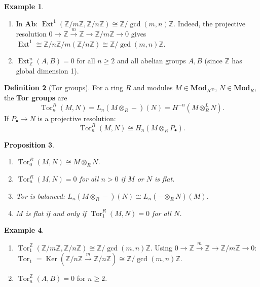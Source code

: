 \documentclass[a4paper,12pt]{book}
\DeclareMathOperator{\Ker}{Ker}
\newcommand{\Ab}{\mathbf{Ab}}
\newcommand{\Mod}{\mathbf{Mod}}
\newcommand{\op}{\mathrm{op}}
\theoremstyle{definition}
\newtheorem{definition}{Definition}[section]
\newtheorem{example}[definition]{Example}
\theoremstyle{plain}
\newtheorem{proposition}[definition]{Proposition}
\theoremstyle{remark}
\begin{document}
\begin{example}\label{ex:ext-computations}
\begin{enumerate}
    \item{}
    In $\Ab$: $\operatorname{Ext}^1(\mathbb{Z}/m\mathbb{Z}, \mathbb{Z}/n\mathbb{Z})
    \cong \mathbb{Z}/\gcd(m,n)\mathbb{Z}$.
    Indeed, the projective resolution $0 \to \mathbb{Z} \xrightarrow{m} \mathbb{Z} \to \mathbb{Z}/m\mathbb{Z} \to 0$
    gives $\operatorname{Ext}^1 \cong \mathbb{Z}/n\mathbb{Z} \big/ m(\mathbb{Z}/n\mathbb{Z})
    \cong \mathbb{Z}/\gcd(m,n)\mathbb{Z}$.
    \item $\operatorname{Ext}^n_{\mathbb{Z}}(A, B) = 0$ for all $n \geq 2$ and all
    abelian groups $A, B$ (since $\mathbb{Z}$ has global dimension 1).
\end{enumerate}
\end{example}

\begin{definition}[Tor groups]\label{def:tor}
For a ring $R$ and modules $M \in \Mod_{R^{\op}}$, $N \in \Mod_R$, the \textbf{Tor groups} are
\[
    \operatorname{Tor}_n^R(M, N) = L_n(M \otimes_R -)(N) = H^{-n}(M \otimes_R^L N).
\]
If $P_\bullet \to N$ is a projective resolution:
\[
    \operatorname{Tor}_n^R(M, N) \cong H_n(M \otimes_R P_\bullet).
\]
\end{definition}

\begin{proposition}\label{prop:tor-properties}
\begin{enumerate}
    \item $\operatorname{Tor}_0^R(M, N) \cong M \otimes_R N$.
    \item $\operatorname{Tor}_n^R(M, N) = 0$ for all $n > 0$ if $M$ or $N$ is flat.
    \item Tor is balanced: $L_n(M \otimes_R -)(N) \cong L_n(- \otimes_R N)(M)$.
    \item $M$ is flat if and only if $\operatorname{Tor}_1^R(M, N) = 0$ for all $N$.
\end{enumerate}
\end{proposition}

\begin{example}\label{ex:tor-computations}
\begin{enumerate}
    \item{}
    $\operatorname{Tor}_1^{\mathbb{Z}}(\mathbb{Z}/m\mathbb{Z}, \mathbb{Z}/n\mathbb{Z})
    \cong \mathbb{Z}/\gcd(m,n)\mathbb{Z}$.
    Using $0 \to \mathbb{Z} \xrightarrow{m} \mathbb{Z} \to \mathbb{Z}/m\mathbb{Z} \to 0$:
    $\operatorname{Tor}_1 = \Ker(\mathbb{Z}/n\mathbb{Z} \xrightarrow{m} \mathbb{Z}/n\mathbb{Z})
    \cong \mathbb{Z}/\gcd(m,n)\mathbb{Z}$.
    \item $\operatorname{Tor}_n^{\mathbb{Z}}(A, B) = 0$ for $n \geq 2$.
\end{enumerate}
\end{example}
\end{document}

